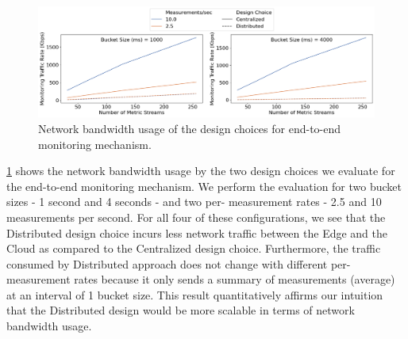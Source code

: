 \begin{figure}
\centering
\includegraphics[width=\linewidth]{figures/design_space/monitoring/nw_usage.png}
\caption{Network bandwidth usage of the design choices for end-to-end monitoring mechanism.}
\label{fig:monitoring_nw_usage}
\end{figure}
\cref{fig:monitoring_nw_usage} shows the network bandwidth usage by the two design choices we evaluate for the end-to-end monitoring mechanism. We perform the evaluation for two bucket sizes - 1 second and 4 seconds - and two per- measurement rates - 2.5 and 10 measurements per second. For all four of these configurations, we see that the Distributed design choice incurs less network traffic between the Edge and the Cloud as compared to the Centralized design choice. Furthermore, the traffic consumed by Distributed approach does not change with different per- measurement rates because it only sends a summary of measurements (average) at an interval of 1 bucket size. This result quantitatively affirms our intuition that the Distributed design would be more scalable in terms of network bandwidth usage. 

